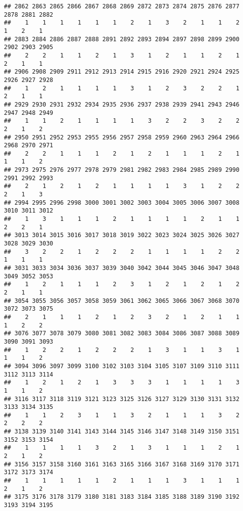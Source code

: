 \documentclass[
]{article}
\begin{document}
\begin{verbatim}
## 2862 2863 2865 2866 2867 2868 2869 2872 2873 2874 2875 2876 2877 2878 2881 2882 
##    1    1    1    1    1    1    2    1    3    2    1    1    2    1    2    1 
## 2883 2884 2886 2887 2888 2891 2892 2893 2894 2897 2898 2899 2900 2902 2903 2905 
##    2    2    1    1    2    1    3    1    2    1    1    2    1    2    1    1 
## 2906 2908 2909 2911 2912 2913 2914 2915 2916 2920 2921 2924 2925 2926 2927 2928 
##    1    2    1    1    1    1    3    1    2    3    2    2    1    2    1    1 
## 2929 2930 2931 2932 2934 2935 2936 2937 2938 2939 2941 2943 2946 2947 2948 2949 
##    1    1    2    1    1    1    1    3    2    2    3    2    2    2    1    2 
## 2950 2951 2952 2953 2955 2956 2957 2958 2959 2960 2963 2964 2966 2968 2970 2971 
##    2    2    1    1    1    2    1    2    1    1    1    2    1    1    1    2 
## 2973 2975 2976 2977 2978 2979 2981 2982 2983 2984 2985 2989 2990 2991 2992 2993 
##    2    1    2    1    2    1    1    1    1    3    1    2    2    2    1    3 
## 2994 2995 2996 2998 3000 3001 3002 3003 3004 3005 3006 3007 3008 3010 3011 3012 
##    1    3    1    1    1    2    1    1    1    1    2    1    1    2    2    1 
## 3013 3014 3015 3016 3017 3018 3019 3022 3023 3024 3025 3026 3027 3028 3029 3030 
##    3    2    2    1    2    2    2    1    1    1    1    2    2    1    1    1 
## 3031 3033 3034 3036 3037 3039 3040 3042 3044 3045 3046 3047 3048 3049 3052 3053 
##    1    2    1    1    1    2    3    1    2    1    2    1    2    2    1    1 
## 3054 3055 3056 3057 3058 3059 3061 3062 3065 3066 3067 3068 3070 3072 3073 3075 
##    2    1    1    1    2    1    2    3    2    1    2    1    1    1    2    2 
## 3076 3077 3078 3079 3080 3081 3082 3083 3084 3086 3087 3088 3089 3090 3091 3093 
##    1    2    2    1    2    2    2    1    3    1    1    3    1    1    1    2 
## 3094 3096 3097 3099 3100 3102 3103 3104 3105 3107 3109 3110 3111 3112 3113 3114 
##    1    2    1    2    1    3    3    3    1    1    1    1    3    1    1    2 
## 3116 3117 3118 3119 3121 3123 3125 3126 3127 3129 3130 3131 3132 3133 3134 3135 
##    1    1    2    3    1    1    3    2    1    1    1    3    2    2    2    2 
## 3138 3139 3140 3141 3143 3144 3145 3146 3147 3148 3149 3150 3151 3152 3153 3154 
##    1    1    1    1    3    2    1    3    1    1    1    2    1    2    1    2 
## 3156 3157 3158 3160 3161 3163 3165 3166 3167 3168 3169 3170 3171 3172 3173 3174 
##    1    1    1    1    1    2    1    1    1    3    1    1    1    2    1    2 
## 3175 3176 3178 3179 3180 3181 3183 3184 3185 3188 3189 3190 3192 3193 3194 3195 

\end{verbatim}
\end{document}
